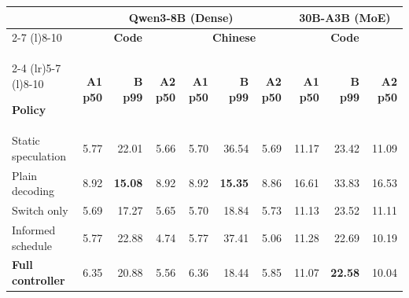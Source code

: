 
\begingroup
\renewcommand{\arraystretch}{1.20}
\setlength{\tabcolsep}{3pt}

\begin{tabular}{@{}l*{9}{r}@{}}
\toprule

&
\multicolumn{6}{c}{
  \textbf{Qwen3-8B (Dense)}
}
&
\multicolumn{3}{c}{
  \textbf{30B-A3B (MoE)}
} \\

\cmidrule(lr){2-7}
\cmidrule(l){8-10}

&
\multicolumn{3}{c}{\textbf{Code}}
&
\multicolumn{3}{c}{\textbf{Chinese}}
&
\multicolumn{3}{c}{\textbf{Code}} \\

\cmidrule(lr){2-4}
\cmidrule(lr){5-7}
\cmidrule(l){8-10}

\textbf{Policy}
& \textbf{A1 p50}
& \textbf{B p99}
& \textbf{A2 p50}
& \textbf{A1 p50}
& \textbf{B p99}
& \textbf{A2 p50}
& \textbf{A1 p50}
& \textbf{B p99}
& \textbf{A2 p50} \\

\midrule

Static speculation
& 5.77 & 22.01 & 5.66
& 5.70 & 36.54 & 5.69
& 11.17 & 23.42 & 11.09 \\

Plain decoding
& 8.92
& \cellcolor{tabBest}\textbf{15.08}
& 8.92
& 8.92
& \cellcolor{tabBest}\textbf{15.35}
& 8.86
& 16.61 & 33.83 & 16.53 \\

Switch only
& 5.69 & 17.27 & 5.65
& 5.70 & 18.84 & 5.73
& 11.13 & 23.52 & 11.11 \\

Informed schedule
& 5.77 & 22.88 & 4.74
& 5.77 & 37.41 & 5.06
& 11.28 & 22.69 & 10.19 \\

\addlinespace[3pt]

\rowcolor{tabFull}
\textbf{Full controller}
& 6.35 & 20.88 & 5.56
& 6.36 & 18.44 & 5.85
& 11.07
& \cellcolor{tabBest}\textbf{22.58}
& 10.04 \\

\bottomrule
\end{tabular}
\endgroup
